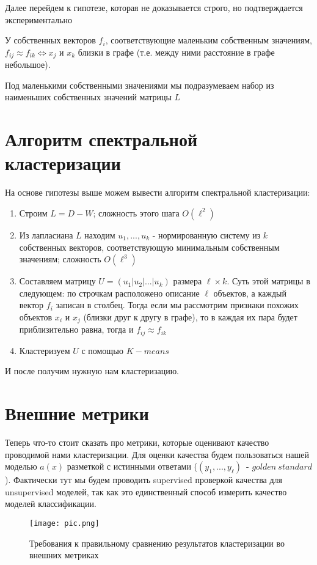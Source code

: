 \documentclass[12pt,fleqn]{article}
\begin{document}
Далее перейдем к гипотезе, которая не доказывается строго, но подтверждается экспериментально

\begin{vkHypothesis}
	У собственных векторов $f_i$, соответствующие маленьким собственным значениям, $f_{ij}\approx f_{ik} \Leftrightarrow x_j$ и $x_k$ близки в графе (т.е. между ними расстояние в графе небольшое).
\end{vkHypothesis}
Под маленькими собственными значениями мы подразумеваем набор из наименьших собственных значений матрицы $L$

\section{Алгоритм спектральной кластеризации}
На основе гипотезы выше можем вывести алгоритм спектральной кластеризации:
\begin{enumerate}
	\item Строим $L = D - W$; сложность этого шага $O(\ell^2)$
	\item Из лапласиана $L$ находим $u_1,...,u_k$ - нормированную систему из $k$ собственных векторов, соответствующую минимальным собственным значениям; сложность $O(\ell^3)$
	\item Составляем матрицу $U = (u_1|u_2|...|u_k)$ размера $\ell \times k$. Суть этой матрицы в следующем: по строчкам расположено описание $\ell$ объектов, а каждый вектор $f_i$ записан в столбец. Тогда если мы рассмотрим признаки похожих объектов $x_i$ и $x_j$ (близки друг к другу в графе), то в каждая их пара будет приблизительно равна, тогда и $f_{ij} \approx f_{ik}$
	\item Кластеризуем $U$ с помощью $K-means$
\end{enumerate}
И после получим нужную нам кластеризацию.

\section{Внешние метрики}
Теперь что-то стоит сказать про метрики, которые оценивают качество проводимой нами кластеризации. Для оценки качества будем пользоваться нашей моделью $a(x)$ разметкой с истинными ответами ($(y_1,...,y_{\ell})$~- $golden~standard$). Фактически тут мы будем проводить supervised проверкой качества для unsupervised моделей, так как это единственный способ измерить качество моделей классификации.

\begin{figure}[t]
	\centering
	\texttt{[image: pic.png]}
	\caption{Требования к правильному сравнению результатов кластеризации во внешних метриках}
	\label{fig:terms}
\end{figure}
\end{document}
